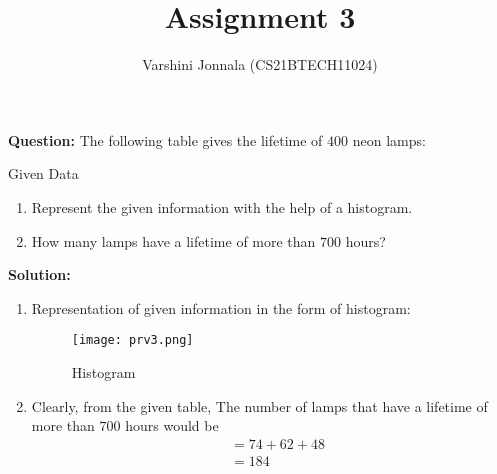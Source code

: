 \documentclass[journal,12pt,twocolumn]{IEEEtran}
\title{Assignment 3}
\author{Varshini Jonnala (CS21BTECH11024)}
\newcommand{\question}{\noindent \textbf{Question: }}
\newcommand{\solution}{\noindent \textbf{Solution: }}
\begin{document}
    \maketitle
    \question
    The following table gives the lifetime of $400$ neon lamps:
    \begin{table}[ht!]
            
        \caption{Given Data}
	        \label{Tables:Table}
    \end{table}
    \begin{enumerate}[label=(\roman*)]
		\item Represent the given information with the help of a histogram.
		\item How many lamps have a lifetime of more than $700$ hours?
    \end{enumerate}
    \solution 
     \begin{enumerate}[label=(\roman*)]
         \item Representation of given information in the form of histogram:
         \begin{figure}[!ht]
		    \centering
		    \texttt{[image: prv3.png]}
		    \caption{Histogram}
        \label{fig:fig-1}
    	\end{figure}
	
         \item Clearly, from the given table, The number of lamps that have a lifetime of more than $700$ hours would be 
         \begin{align}
              &= 74 + 62 + 48 \\
              &= 184
         \end{align}
     \end{enumerate}
\end{document}

